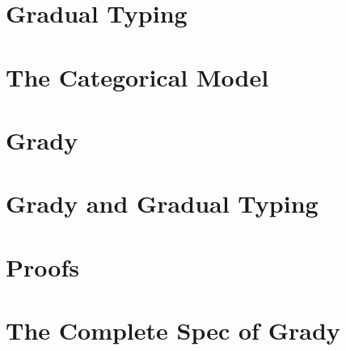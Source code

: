 \documentclass[preprint]{sigplanconf}
\begin{document}
\section{Gradual Typing}
\label{sec:gradual_typing}


\section{The Categorical Model}
\label{sec:categorical_model}


\section{Grady}
\label{sec:grady}


\section{Grady and Gradual Typing}
\label{sec:grady_and_gradual_typing}



\nocite{*}



\appendix

\section{Proofs}
\label{sec:proofs}



\section{The Complete Spec of Grady}
\label{sec:the_complete_spec_of_grady}
\Gradyall{}
\end{document}
